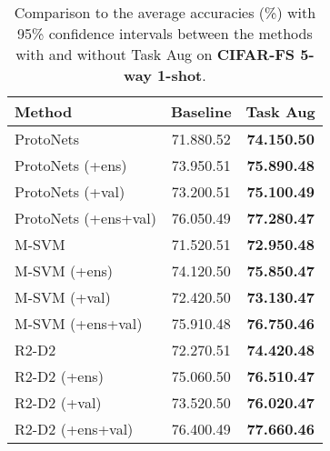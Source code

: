 \documentclass[10pt,twocolumn,letterpaper]{article}
\begin{document}
\begin{table}
\caption{Comparison to the average accuracies (\%) with 95\% confidence intervals between the methods with and without Task Aug on \textbf{CIFAR-FS 5-way 1-shot}.}
\label{CIFAR-FS_1shot}
\begin{center}
\begin{tabular}{lcc}
\toprule[1pt]
\textbf{Method} & Baseline & Task Aug \\
\hline
ProtoNets~\cite{snell2017prototypical} & 71.880.52 & \textbf{74.150.50}\\
ProtoNets (+ens) & 73.950.51 & \textbf{75.890.48}\\
ProtoNets (+val) & 73.200.51 & \textbf{75.100.49}\\
ProtoNets (+ens+val) & 76.050.49 & \textbf{77.280.47}\\
\hline
M-SVM~\cite{lee2019meta} & 71.520.51 & \textbf{72.950.48}\\
M-SVM (+ens) & 74.120.50 & \textbf{75.850.47}\\
M-SVM (+val) & 72.420.50 & \textbf{73.130.47}\\
M-SVM (+ens+val) & 75.910.48 & \textbf{76.750.46}\\
\hline
R2-D2~\cite{bertinetto2018meta} & 72.270.51 & \textbf{74.420.48}\\
R2-D2 (+ens) & 75.060.50 & \textbf{76.510.47}\\
R2-D2 (+val) & 73.520.50 & \textbf{76.020.47}\\
R2-D2 (+ens+val) & 76.400.49 & \textbf{77.660.46}\\
\bottomrule[1pt]
\end{tabular}
\end{center}
\end{table}
\end{document}
